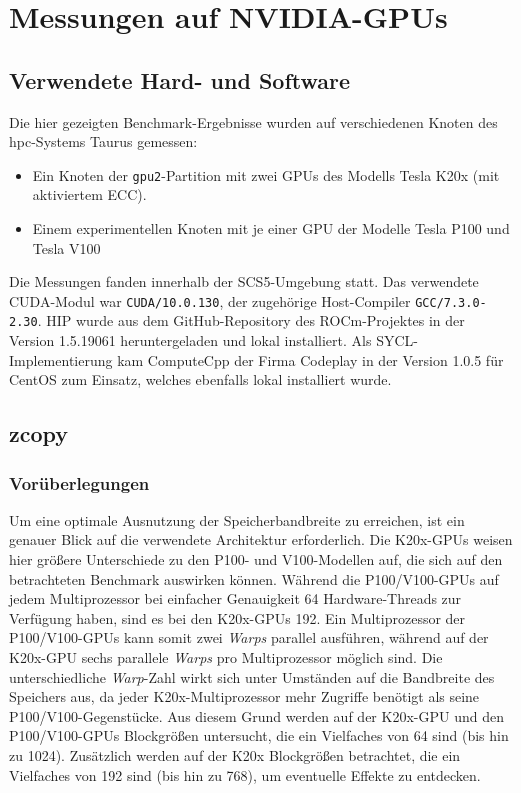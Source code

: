 \section{Messungen auf NVIDIA-GPUs}
\label{nvidia}

\subsection{Verwendete Hard- und Software}

Die hier gezeigten Benchmark-Ergebnisse wurden auf verschiedenen Knoten des
\gls{hpc}-Systems Taurus gemessen:

\begin{itemize}
    \item Ein Knoten der \texttt{gpu2}-Partition mit zwei GPUs des Modells Tesla
          K20x (mit aktiviertem ECC).
    \item Einem experimentellen Knoten mit je einer GPU der Modelle Tesla P100
          und Tesla V100
\end{itemize}

Die Messungen fanden innerhalb der SCS5-Umgebung statt. Das verwendete
CUDA-Modul war \texttt{CUDA/10.0.130}, der zugehörige Host-Compiler
\texttt{GCC/7.3.0-2.30}. HIP wurde aus dem GitHub-Repository des ROCm-Projektes
in der Version 1.5.19061 heruntergeladen und lokal installiert. Als
SYCL-Implementierung kam ComputeCpp der Firma Codeplay in der Version 1.0.5 für
CentOS zum Einsatz, welches ebenfalls lokal installiert wurde.

\subsection{zcopy}

\subsubsection{Vorüberlegungen}

Um eine optimale Ausnutzung der Speicherbandbreite zu erreichen, ist ein genauer
Blick auf die verwendete Architektur erforderlich. Die K20x-GPUs weisen hier
größere Unterschiede zu den P100- und V100-Modellen auf, die sich auf den
betrachteten Benchmark auswirken können. Während die P100/V100-GPUs auf jedem
Multiprozessor bei einfacher Genauigkeit \num{64} Hardware-Threads zur Verfügung
haben, sind es bei den K20x-GPUs \num{192}. Ein Multiprozessor der
P100/V100-GPUs kann somit zwei \textit{Warps} parallel ausführen, während auf
der K20x-GPU sechs parallele \textit{Warps} pro Multiprozessor möglich sind. Die
unterschiedliche \textit{Warp}-Zahl wirkt sich unter Umständen auf die
Bandbreite des Speichers aus, da jeder K20x-Multiprozessor mehr Zugriffe
benötigt als seine P100/V100-Gegenstücke. Aus diesem Grund werden auf der
K20x-GPU und den P100/V100-GPUs Blockgrößen untersucht, die ein Vielfaches von
\num{64} sind (bis hin zu \num{1024}). Zusätzlich werden auf der K20x
Blockgrößen betrachtet, die ein Vielfaches von \num{192} sind (bis hin zu
\num{768}), um eventuelle Effekte zu entdecken.

